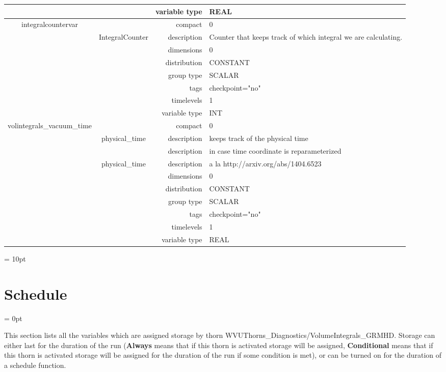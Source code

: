 \begin{tabular*}{150mm}{|c|c@{\extracolsep{\fill}}|rl|}
 &  & variable type & REAL \\ 
\hline 
integralcountervar &  & compact & 0 \\ 
 & IntegralCounter & description & Counter that keeps track of which integral we are calculating. \\ 
 &  & dimensions & 0 \\ 
 &  & distribution & CONSTANT \\ 
 &  & group type & SCALAR \\ 
 &  & tags & checkpoint="no" \\ 
 &  & timelevels & 1 \\ 
 &  & variable type & INT \\ 
\hline 
volintegrals\_vacuum\_time &  & compact & 0 \\ 
 & physical\_time & description & keeps track of the physical time \\ 
& ~ & description &  in case time coordinate is reparameterized \\ 
 & physical\_time & description &  a la http://arxiv.org/abs/1404.6523 \\ 
 &  & dimensions & 0 \\ 
 &  & distribution & CONSTANT \\ 
 &  & group type & SCALAR \\ 
 &  & tags & checkpoint="no" \\ 
 &  & timelevels & 1 \\ 
 &  & variable type & REAL \\ 
\hline 
\end{tabular*} 



\vspace{5mm}\parskip = 10pt 

\section{Schedule} 


\parskip = 0pt


\noindent This section lists all the variables which are assigned storage by thorn WVUThorns\_Diagnostics/VolumeIntegrals\_GRMHD.  Storage can either last for the duration of the run ({\bf Always} means that if this thorn is activated storage will be assigned, {\bf Conditional} means that if this thorn is activated storage will be assigned for the duration of the run if some condition is met), or can be turned on for the duration of a schedule function.


